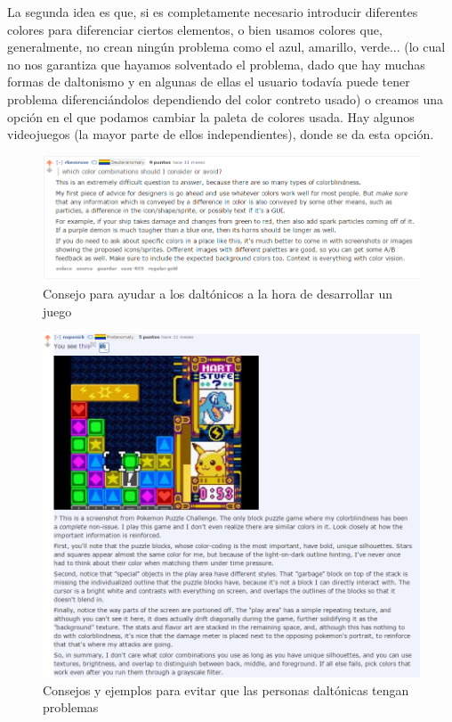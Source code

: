 La segunda idea es que, si es completamente necesario introducir diferentes colores para diferenciar ciertos elementos, o bien usamos colores que, generalmente, no crean ningún problema como el azul, amarillo, verde... (lo cual no nos garantiza que hayamos solventado el problema, dado que hay muchas formas de daltonismo y en algunas de ellas el usuario todavía puede tener problema diferenciándolos dependiendo del color contreto usado) o creamos una opción en el que podamos cambiar la paleta de colores usada. Hay algunos videojuegos (la mayor parte de ellos independientes), donde se da esta opción. 

\begin{figure}[H]
		\includegraphics[width=\textwidth,height=\textheight,keepaspectratio]{./img/redditcolorblind1.png}
	\caption{Consejo para ayudar a los daltónicos a la hora de desarrollar un juego}
	\label{fig:roomsgamecolorblind1}
\end{figure}

\begin{figure}[H]
		\includegraphics[width=\textwidth,height=\textheight,keepaspectratio]{./img/redditcolorblind2.png}
	\caption{Consejos y ejemplos para evitar que las personas daltónicas tengan problemas}
	\label{fig:roomsgamecolorblind2}
\end{figure}

